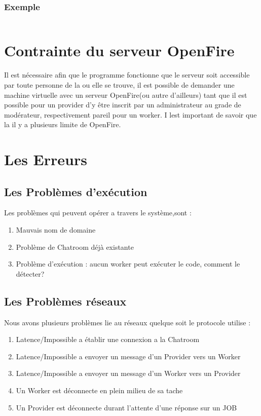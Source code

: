 \documentclass[11pt]{article}
\begin{document}
\subsubsection{Exemple}
\inputminted{perl}{../Echantillon_Script_build/build.pl}
\newpage
\section{Contrainte du serveur OpenFire }
Il est nécessaire afin que le programme fonctionne que le serveur soit accessible par toute personne de la ou elle se trouve, il est possible de demander une machine virtuelle avec un serveur OpenFire(ou autre d’ailleurs) tant que il est possible pour un provider d'y être inscrit par un administrateur au grade de modérateur, respectivement pareil pour un worker. 
I lest important de savoir que la il y a plusieurs limite de OpenFire.
\newpage
\section{Les Erreurs} 
\subsection{Les Problèmes d'exécution}
Les problèmes qui peuvent opérer a travers le système,sont : 
\begin{enumerate}
\item Mauvais nom de domaine 
\item Problème de Chatroom déjà existante
\item Problème d'exécution : aucun worker peut exécuter le code, comment le détecter?

\end{enumerate}  

\newpage
\subsection{Les Problèmes réseaux}
Nous avons plusieurs problèmes lie au réseaux quelque soit le protocole utilise :
\begin{enumerate}
\item Latence/Impossible a établir une  connexion a la Chatroom
\item Latence/Impossible a envoyer un  message d'un Provider vers un Worker
\item Latence/Impossible a envoyer un  message d'un Worker vers un Provider
\item Un Worker est déconnecte en plein milieu de sa tache
\item Un Provider est déconnecte durant l'attente d'une réponse sur un JOB
\end{enumerate}
\end{document}
